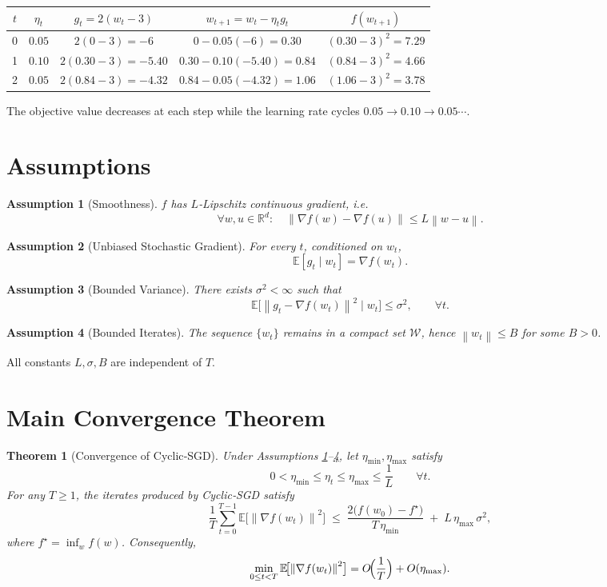 \documentclass{article}
\newtheorem{theorem}{Theorem}
\newtheorem{assumption}{Assumption}
\newcommand{\E}{\mathbb{E}}
\newcommand{\R}{\mathbb{R}}
\newcommand{\norm}[1]{\left\lVert #1\right\rVert}
\begin{document}
\begin{center}
\begin{tabular}{c|c|c|c|c}
$t$ & $\eta_{t}$ & $g_{t}=2(w_{t}-3)$ & $w_{t+1}=w_{t}-\eta_{t}g_{t}$ & $f(w_{t+1})$\\\hline
0 & $0.05$ & $2(0-3)=-6$ & $0-0.05(-6)=0.30$ & $(0.30-3)^{2}=7.29$\\
1 & $0.10$ & $2(0.30-3)=-5.40$ & $0.30-0.10(-5.40)=0.84$ & $(0.84-3)^{2}=4.66$\\
2 & $0.05$ & $2(0.84-3)=-4.32$ & $0.84-0.05(-4.32)=1.06$ & $(1.06-3)^{2}=3.78$\\
\end{tabular}
\end{center}
The objective value decreases at each step while the learning rate cycles
$0.05\rightarrow0.10\rightarrow0.05\cdots$.

\newpage
\section*{Assumptions}
\begin{assumption}[Smoothness]\label{ass:smooth}
$f$ has $L$‑Lipschitz continuous gradient, i.e.
\[
\forall w,u\in\R^{d}:\quad
\norm{\nabla f(w)-\nabla f(u)}\le L\norm{w-u}.
\]
\end{assumption}
\begin{assumption}[Unbiased Stochastic Gradient]\label{ass:unbiased}
For every $t$, conditioned on $w_{t}$,
\[
\E[g_{t}\mid w_{t}]=\nabla f(w_{t}).
\]
\end{assumption}
\begin{assumption}[Bounded Variance]\label{ass:variance}
There exists $\sigma^{2}<\infty$ such that
\[
\E\bigl[\norm{g_{t}-\nabla f(w_{t})}^{2}\mid w_{t}\bigr]\le\sigma^{2},
\qquad\forall t.
\]
\end{assumption}
\begin{assumption}[Bounded Iterates]\label{ass:bounded}
The sequence $\{w_{t}\}$ remains in a compact set $\mathcal{W}$,
hence $\norm{w_{t}}\le B$ for some $B>0$.
\end{assumption}
All constants $L,\sigma,B$ are independent of $T$.

\section*{Main Convergence Theorem}
\begin{theorem}[Convergence of Cyclic‑SGD]\label{thm:main}
Under Assumptions \ref{ass:smooth}–\ref{ass:bounded}, let $\eta_{\min},\eta_{\max}$ satisfy
\[
0<\eta_{\min}\le\eta_{t}\le\eta_{\max}\le\frac{1}{L}\qquad\forall t.
\]
For any $T\ge1$, the iterates produced by Cyclic‑SGD satisfy
\[
\boxed{\;
\frac{1}{T}\sum_{t=0}^{T-1}\E\!\bigl[\norm{\nabla f(w_{t})}^{2}\bigr]
\;\le\;
\frac{2\bigl(f(w_{0})-f^{\star}\bigr)}{T\,\eta_{\min}}
\;+\;
L\,\eta_{\max}\,\sigma^{2},
\;}
\tag{1}
\]
where $f^{\star}=\inf_{w}f(w)$. Consequently,
\[
\min_{0\le t<T}\E\!\bigl[\norm{\nabla f(w_{t})}^{2}\bigr]
=O\!\Bigl(\frac{1}{T}\Bigr)+O(\eta_{\max}).
\]
\end{theorem}
\end{document}
